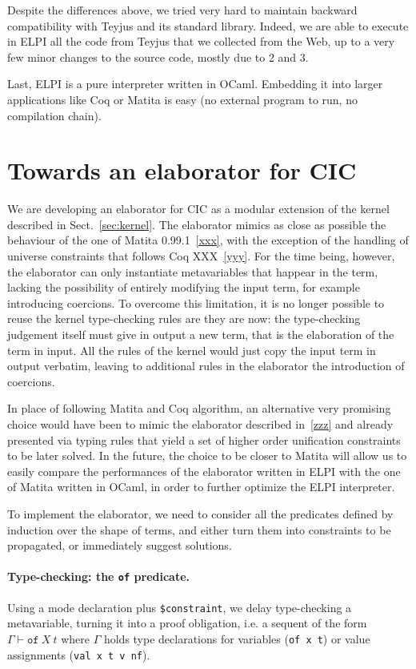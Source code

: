 \documentclass{easychair}
\begin{document}
Despite the differences above, we tried very hard to maintain backward
compatibility with Teyjus and its standard library. Indeed, we are able to
execute in ELPI all the code from Teyjus that we collected from the Web, up to
a very few minor changes to the source code, mostly due to 2 and 3.

Last, ELPI is a pure interpreter written in OCaml.  Embedding it into
larger applications like Coq or Matita is easy (no external program to
run, no compilation chain).


\section{Towards an elaborator for CIC}\label{sec:elaborator}
We are developing an elaborator for CIC as a modular extension of the kernel described in Sect.~\ref{sec:kernel}. The elaborator mimics as close as possible the behaviour of the one of Matita 0.99.1~\ref{xxx}, with the exception of the handling of universe constraints that follows Coq XXX~\ref{yyy}. For the time being, however, the elaborator can only instantiate metavariables that happear in the term, lacking the possibility of entirely modifying the input term, for example introducing coercions. To overcome this limitation, it is no longer possible to reuse the kernel type-checking rules are they are now: the type-checking judgement itself must give in output a new term, that is the elaboration of the term in input. All the rules of the kernel would just copy the input term in output verbatim, leaving to additional rules in the elaborator the introduction of coercions.

In place of following Matita and Coq algorithm, an alternative very promising choice would have been to mimic the elaborator described in~\ref{zzz} and already presented via typing rules that yield a set of higher order unification constraints to be later solved. In the future, the choice to be closer to Matita will allow us to easily compare the performances of the elaborator written in ELPI with the one of Matita written in OCaml, in order to further optimize the ELPI interpreter.

To implement the elaborator, we need to consider all the predicates defined by induction over the shape of terms, and either turn them into constraints to be propagated, or immediately suggest solutions.

\paragraph{Type-checking: the \texttt{of} predicate.}
Using a mode declaration plus \verb+$constraint+, we delay type-checking a
metavariable, turning it into a proof obligation, i.e. a sequent of the form $\Gamma \vdash \mathtt{of}~X~t$ where $\Gamma$ holds type declarations for variables (\verb+of x t+) or value assignments (\verb+val x t v nf+).
\end{document}
